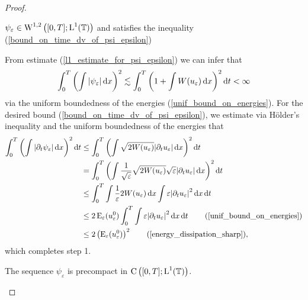 \begin{proof}
	\begin{description}[wide=0pt]
		\item[Step 1:] $ \psi_{ \varepsilon } \in \operatorname{W}^{ 1 , 2 } \left( [ 0 , T ] ; \operatorname{L}^{ 1 } ( \operatorname{\mathbb{T}} ) \right) $ and satisfies the inequality (\ref{bound_on_time_dv_of_psi_epsilon})
		
		From estimate (\ref{l1_estimate_for_psi_epsilon}) we can infer that
		\begin{equation*}
			\int_{ 0 }^{ T }
				\left(
					\int
						\abs{ \psi_{ \varepsilon } }
					\dd{ x }
				\right)^{ 2 }
			\lesssim
			\int_{ 0 }^{ T }
				\left(
					1 + \int W ( u_{ \varepsilon } ) \dd{ x }
				\right)^{ 2 }
			\dd{ t } 
			<
			\infty
		\end{equation*}
		via the uniform boundedness of the energies (\ref{unif_bound_on_energies}). For the desired bound (\ref{bound_on_time_dv_of_psi_epsilon}), we estimate via Hölder's inequality and the uniform boundedness of the energies that
		\begin{align*}
			\int_{ 0 }^{ T }
				\left(
					\int
						\abs{ 
							\partial_{ t } \psi_{ \varepsilon }
						}
					\dd{ x }
				\right)^{ 2 }
			\dd{ t }
			& \leq
			\int_{ 0 }^{ T }
				\left(
					\int
						\sqrt{ 2 W ( u_{ \varepsilon } ) }
						\abs{ \partial_{ t } u_{ \varepsilon } }
					\dd{ x }
				\right)^{ 2 }
			\dd{ t }
			\\
			& =
			\int_{ 0 }^{ T }
				\left(
					\int
						\frac{ 1 }{ \sqrt{\varepsilon } } \sqrt{ 2 W ( u_{ \varepsilon } ) }
						\sqrt{ \varepsilon } \abs{ \partial_{ t } u_{ \varepsilon } }
					\dd{ x }
				\right)^{ 2 }
			\dd{ t }
			\\
			& \leq
			\int_{ 0 }^{ T }
				\int
					\frac{ 1 }{ \varepsilon }
					2 W ( u_{ \varepsilon } )
				\dd{ x }
				\int
					\varepsilon
					\abs{ \partial_{ t } u_{ \varepsilon } }^{ 2 }
				\dd{ x }
			\dd{ t }
			\\
			& \leq
			2 \energy_{ \varepsilon } ( u_{ \varepsilon }^{ 0 } )
			\int_{ 0 }^{ T }
				\int
					\varepsilon
					\abs{ \partial_{ t } u_{ \varepsilon } }^{ 2 }
				\dd{ x }
			\dd{ t }
			\tag{\ref{unif_bound_on_energies}}
			\\
			& \leq
			2 \left(\energy_{ \varepsilon } ( u_{ \varepsilon }^{ 0 } )\right)^{ 2 }
			\tag{\ref{energy_dissipation_sharp}},
		\end{align*}
		which completes step 1.
		
		\item[Step 2:] The sequence $ \psi_{ \varepsilon } $ is precompact in $ \operatorname{C} \left( [ 0 , T ] ; \operatorname{L}^{ 1 } ( \operatorname{\mathbb{T}} ) \right) $.
		

\end{description}
\end{proof}
